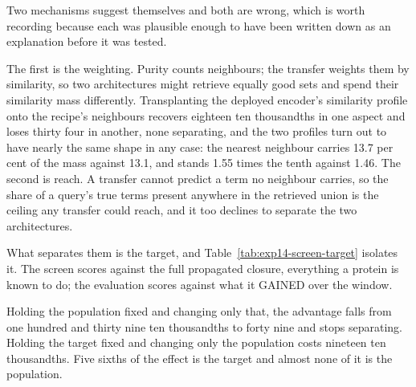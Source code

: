 \begin{table}[htbp]
  \centering
  \caption{Neighbour purity and maximum F-measure against the deployed encoder, in the
  served no-knowledge cell of 649 proteins, at ten neighbours. Purity is measured on
  proteins of other categories, so no arm is scored on what it was fitted on. Intervals
  are a paired bootstrap with the measure recomputed inside every resample.}
  \label{tab:exp14-screen-vs-task}
  
\end{table}

Two mechanisms suggest themselves and both are wrong, which is worth recording because
each was plausible enough to have been written down as an explanation before it was
tested.

The first is the weighting. Purity counts neighbours; the transfer weights them by
similarity, so two architectures might retrieve equally good sets and spend their
similarity mass differently. Transplanting the deployed encoder's similarity profile onto
the recipe's neighbours recovers eighteen ten thousandths in one aspect and loses
thirty four in another, none separating, and the two profiles turn out to have nearly the
same shape in any case: the nearest neighbour carries 13.7 per cent of the mass against
13.1, and stands 1.55 times the tenth against 1.46. The second is reach. A transfer
cannot predict a term no neighbour carries, so the share of a query's true terms present
anywhere in the retrieved union is the ceiling any transfer could reach, and it too
declines to separate the two architectures.

What separates them is the target, and Table~\ref{tab:exp14-screen-target} isolates it.
The screen scores against the full propagated closure, everything a protein is known to
do; the evaluation scores against what it GAINED over the window.

\begin{table}[htbp]
  \centering
  \caption{Neighbour purity of the recipe against the deployed encoder, with the
  population and the target varied one at a time. $^{\dagger}$~does not separate.}
  \label{tab:exp14-screen-target}
  
\end{table}
 Holding the population fixed and changing only that, the advantage falls from
one hundred and thirty nine ten thousandths to forty nine and stops separating. Holding
the target fixed and changing only the population costs nineteen ten thousandths. Five
sixths of the effect is the target and almost none of it is the population.

